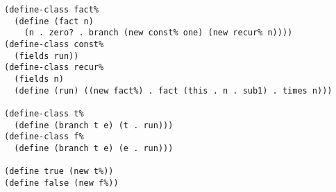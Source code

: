 \documentclass[12pt]{article}                   %
\newenvironment{solution}{}{}
\begin{document}
\begin{solution}
\begin{verbatim}
(define-class fact%
  (define (fact n)
    (n . zero? . branch (new const% one) (new recur% n))))
(define-class const%
  (fields run))
(define-class recur%
  (fields n)
  (define (run) ((new fact%) . fact (this . n . sub1) . times n)))

(define-class t%
  (define (branch t e) (t . run)))
(define-class f%
  (define (branch t e) (e . run)))

(define true (new t%))
(define false (new f%))
\end{verbatim}
\end{solution}
\end{document}

